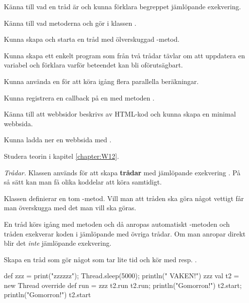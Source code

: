 

\Exercise{\ExeWeekTWELVE}

\begin{Goals}
\item Känna till vad en tråd är och kunna förklara begreppet jämlöpande exekvering.
\item Känna till vad metoderna  och  gör i klassen .
\item Kunna skapa och starta en tråd med ölverskuggad -metod.
\item Kunna skapa ett enkelt program som från två trådar tävlar om att uppdatera en variabel och förklara varför beteendet kan bli oförutsägbart.
\item Kunna använda en  för att köra igång flera parallella beräkningar.
\item Kunna registrera en callback på en  med metoden .
\item Känna till att webbsidor beskrivs av HTML-kod och kunna skapa en minimal webbsida.
\item Kunna ladda ner en webbsida med .
\end{Goals}

\begin{Preparations}
\item Studera teorin i kapitel \ref{chapter:W12}.
\end{Preparations}

\BasicTasks %

\Task \emph{Trådar.}  Klassen  används för att skapa  \textbf{trådar} med jämlöpande exekvering . På så sätt kan man få olika koddelar att köra samtidigt. 

Klassen  definierar en tom -metod. Vill man att tråden ska göra något vettigt får man överskugga  med det man vill ska göras. 

En tråd körs igång med metoden  och då anropas automatiskt -metoden och tråden exekverar koden i  jämlöpande med övriga trådar. Om man anropar  direkt blir det \emph{inte} jämlöpande exekvering. 

\Subtask Skapa en tråd som gör något som tar lite tid och kör med  resp. .
\begin{REPL}
def zzz = { print("zzzzzz"); Thread.sleep(5000); println(" VAKEN!")}
zzz
val t2 = new Thread{ override def run = zzz }
t2.run
t2.run; println("Gomorron!")
t2.start; println("Gomorron!")
t2.start
\end{REPL}

